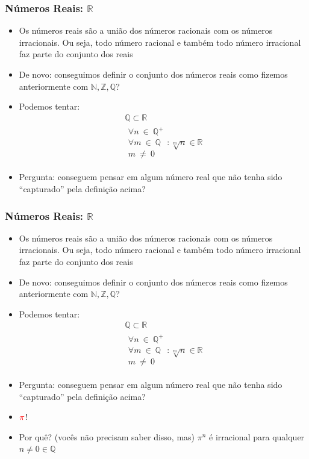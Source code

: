 \documentclass[usenames,dvipsnames,svgnames]{beamer}
\begin{document}
\begin{frame}	
	\frametitle{Números Reais: $\mathbb{R}$}

	\begin{itemize}
		\item Os números reais são a união dos números racionais com os números irracionais. Ou seja, todo número racional e também todo número irracional faz parte do conjunto dos reais
		\item De novo: conseguimos definir o conjunto dos números reais como fizemos anteriormente com $\mathbb{N}, \mathbb{Z}, \mathbb{Q}$?
		\item Podemos tentar:
			\begin{equation}
			\begin{aligned}
				\mathbb{Q} \subset \mathbb{R} \\
				\substack{\forall n ~\in~ \mathbb{Q}^{+} \\ \forall m ~\in~ \mathbb{Q} \\ m ~\neq~ 0}: \sqrt[m]{n} \in \mathbb{R}
			\end{aligned}
			\end{equation}
		\item Pergunta: conseguem pensar em algum número real que não tenha sido ``capturado'' pela definição acima?
	\end{itemize}
\end{frame}

\begin{frame}	
	\frametitle{Números Reais: $\mathbb{R}$}

	\begin{itemize}
		\item Os números reais são a união dos números racionais com os números irracionais. Ou seja, todo número racional e também todo número irracional faz parte do conjunto dos reais
		\item De novo: conseguimos definir o conjunto dos números reais como fizemos anteriormente com $\mathbb{N}, \mathbb{Z}, \mathbb{Q}$?
		\item Podemos tentar:
			\begin{equation}
			\begin{aligned}
				\mathbb{Q} \subset \mathbb{R} \\
				\substack{\forall n ~\in~ \mathbb{Q}^{+} \\ \forall m ~\in~ \mathbb{Q} \\ m ~\neq~ 0}: \sqrt[m]{n} \in \mathbb{R}
			\end{aligned}
			\end{equation}
		\item Pergunta: conseguem pensar em algum número real que não tenha sido ``capturado'' pela definição acima?
		\item $\color{red}\pi$!
		\item Por quê? (vocês não precisam saber disso, mas) $\pi^n$ é irracional para qualquer $n \neq 0 \in \mathbb{Q}$
	\end{itemize}
\end{frame}
\end{document}
